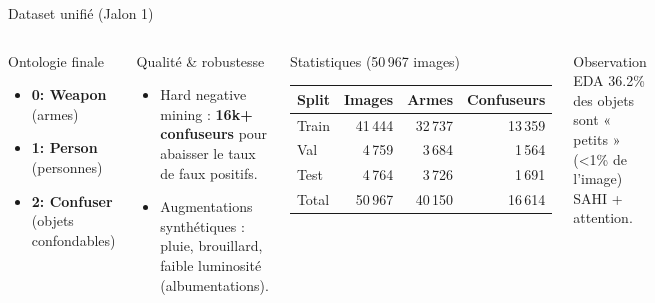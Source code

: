 \documentclass[aspectratio=169,11pt]{beamer}
\begin{document}
\begin{frame}{Dataset unifié (Jalon 1)}
  \begin{columns}[T,onlytextwidth]
    \begin{block}{Ontologie finale}
      \begin{itemize}
        \item \textbf{0: Weapon} (armes)
        \item \textbf{1: Person} (personnes)
        \item \textbf{2: Confuser} (objets confondables)
      \end{itemize}
    \end{block}

    \begin{block}{Qualité \& robustesse}
      \begin{itemize}
        \item Hard negative mining : \textbf{16k+ confuseurs} pour abaisser le taux de faux positifs.
        \item Augmentations synthétiques : pluie, brouillard, faible luminosité (albumentations).
      \end{itemize}
    \end{block}

    \begin{block}{Statistiques (50\,967 images)}
      \footnotesize
      \begin{tabular}{lrrr}
        \toprule
        Split & Images & Armes & Confuseurs \\
        \midrule
        Train & 41\,444 & 32\,737 & 13\,359 \\
        Val   & 4\,759  & 3\,684  & 1\,564 \\
        Test  & 4\,764  & 3\,726  & 1\,691 \\
        \midrule
        Total & 50\,967 & 40\,150 & 16\,614 \\
        \bottomrule
      \end{tabular}
    \end{block}

    \begin{alertblock}{Observation EDA}
      \footnotesize 36.2\% des objets sont « petits » (\textless 1\% de l'image) \rightarrow{} SAHI + attention.
    \end{alertblock}
  \end{columns}
\end{frame}

\end{document}
